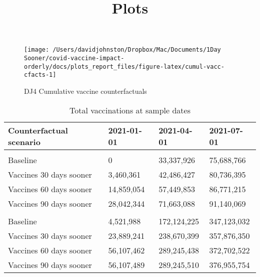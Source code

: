 \documentclass[
  12pt,
]{article}
\title{Plots}
\author{}
\date{\vspace{-2.5em}}
\begin{document}
\maketitle

\begin{figure}

{\centering \texttt{[image: /Users/davidjohnston/Dropbox/Mac/Documents/1Day Sooner/covid-vaccine-impact-orderly/docs/plots\_report\_files/figure-latex/cumul-vacc-cfacts-1]} 

}

\caption{DJ4 Cumulative vaccine counterfactuals}\label{fig:cumul-vacc-cfacts}
\end{figure}
\begin{table}

\caption{\label{tab:vaccinations-table}Total vaccinations at sample dates}
\centering
\begin{tabular}[t]{llll}
\toprule
Counterfactual scenario & 2021-01-01 & 2021-04-01 & 2021-07-01\\
\midrule
\addlinespace[0.3em]
\multicolumn{4}{l}{\textbf{United Kingdom}}\\
\hspace{1em}Baseline & 0 & 33,337,926 & 75,688,766\\
\hspace{1em}Vaccines 30 days sooner & 3,460,361 & 42,486,427 & 80,736,395\\
\hspace{1em}Vaccines 60 days sooner & 14,859,054 & 57,449,853 & 86,771,215\\
\hspace{1em}Vaccines 90 days sooner & 28,042,344 & 71,663,088 & 91,140,069\\
\addlinespace[0.3em]
\multicolumn{4}{l}{\textbf{United States}}\\
\hspace{1em}Baseline & 4,521,988 & 172,124,225 & 347,123,032\\
\hspace{1em}Vaccines 30 days sooner & 23,889,241 & 238,670,399 & 357,876,350\\
\hspace{1em}Vaccines 60 days sooner & 56,107,462 & 289,245,438 & 372,702,522\\
\hspace{1em}Vaccines 90 days sooner & 56,107,489 & 289,245,510 & 376,955,754\\
\bottomrule
\end{tabular}
\end{table}
\end{document}
